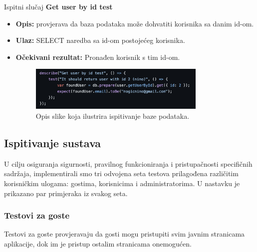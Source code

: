 			Ispitni slučaj \textbf{Get user by id test}
			\begin{itemize}
				\item \textbf{Opis:} provjerava da baza podataka može dohvatiti korisnika sa danim id-om.
				\item \textbf{Ulaz:} SELECT naredba sa id-om postojećeg korisnika.
				\item \textbf{Očekivani rezultat:} Pronađen korisnik s tim id-om.
				\begin{figure}[h]
					\centering
					\includegraphics[width=0.8\textwidth]{slike/testovi/db_user_id_test.png}
					\caption{Opis slike koja ilustrira ispitivanje baze podataka.}
					\label{fig:testovi_db}
				\end{figure}
			\end{itemize}
			\newpage
			
			
			\subsection{Ispitivanje sustava}
			
			U cilju osiguranja sigurnosti, pravilnog funkcioniranja i pristupačnosti specifičnih sadržaja, 
			implementirali smo tri odvojena seta testova prilagođena različitim korisničkim ulogama: gostima, korisnicima i administratorima.
			U nastavku je prikazano par primjeraka iz svakog seta. 

			\subsubsection{Testovi za goste}
			Testovi za goste provjeravaju da gosti mogu pristupiti svim javnim stranicama aplikacije, dok im je pristup ostalim stranicama onemogućen.

